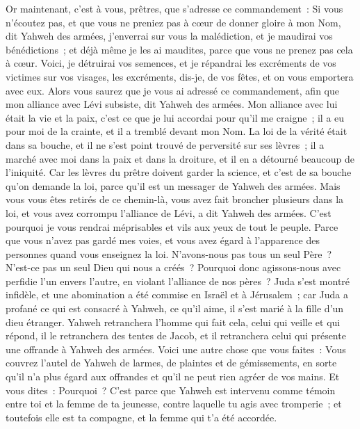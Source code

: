 \begin{multicols}{2}
\VerseOne{}Or maintenant, c'est à vous, prêtres, que s'adresse ce commandement~:
Si vous n'écoutez pas, et que vous ne preniez pas à cœur de donner gloire à mon Nom, dit Yahweh des armées, j'enverrai sur vous la malédiction, et je maudirai vos bénédictions~; et déjà même je les ai maudites, parce que vous ne prenez pas cela à cœur.
Voici, je détruirai vos semences, et je répandrai les excréments de vos victimes sur vos visages, les excréments, dis-je, de vos fêtes, et on vous emportera avec eux.
Alors vous saurez que je vous ai adressé ce commandement, afin que mon alliance avec Lévi subsiste, dit Yahweh des armées.
Mon alliance avec lui était la vie et la paix, c'est ce que je lui accordai pour qu'il me craigne~; il a eu pour moi de la crainte, et il a tremblé devant mon Nom.
La loi de la vérité était dans sa bouche, et il ne s'est point trouvé de perversité sur ses lèvres~; il a marché avec moi dans la paix et dans la droiture, et il en a détourné beaucoup de l'iniquité.
Car les lèvres du prêtre doivent garder la science, et c'est de sa bouche qu'on demande la loi, parce qu'il est un messager de Yahweh des armées.
Mais vous vous êtes retirés de ce chemin-là, vous avez fait broncher plusieurs dans la loi, et vous avez corrompu l'alliance de Lévi, a dit Yahweh des armées.
C'est pourquoi je vous rendrai méprisables et vils aux yeux de tout le peuple. Parce que vous n'avez pas gardé mes voies, et vous avez égard à l'apparence des personnes quand vous enseignez la loi.
N'avons-nous pas tous un seul Père~? N'est-ce pas un seul Dieu qui nous a créés~? Pourquoi donc agissons-nous avec perfidie l'un envers l'autre, en violant l'alliance de nos pères~?
Juda s'est montré infidèle, et une abomination a été commise en Israël et à Jérusalem~; car Juda a profané ce qui est consacré à Yahweh, ce qu'il aime, il s'est marié à la fille d'un dieu étranger.
Yahweh retranchera l'homme qui fait cela, celui qui veille et qui répond, il le retranchera des tentes de Jacob, et il retranchera celui qui présente une offrande à Yahweh des armées.
Voici une autre chose que vous faites~: Vous couvrez l'autel de Yahweh de larmes, de plaintes et de gémissements, en sorte qu'il n'a plus égard aux offrandes et qu'il ne peut rien agréer de vos mains.
Et vous dites~: Pourquoi~? C'est parce que Yahweh est intervenu comme témoin entre toi et la femme de ta jeunesse, contre laquelle tu agis avec tromperie~; et toutefois elle est ta compagne, et la femme qui t'a été accordée.

\end{multicols}
